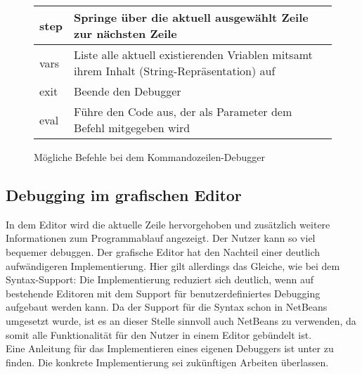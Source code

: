 \begin{figure}
	\centering
	\begin{tabular}{| m{4cm} | m{9cm} |}
	\hline
	step & Springe über die aktuell ausgewählt Zeile zur nächsten Zeile \\ \hline
	vars & Liste alle aktuell existierenden Vriablen mitsamt ihrem Inhalt (String-Repräsentation) auf \\ \hline
	exit & Beende den Debugger \\ \hline
	eval & Führe den Code aus, der als Parameter dem Befehl mitgegeben wird \\ \hline
	\end{tabular}
	\caption{Mögliche Befehle bei dem Kommandozeilen-Debugger}
	\label{fig:Commands_CLI_Debugger}
\end{figure}

\subsection{Debugging im grafischen Editor}
In dem Editor wird die aktuelle Zeile hervorgehoben und zusätzlich weitere Informationen zum Programmablauf angezeigt.
Der Nutzer kann so viel bequemer debuggen.
Der grafische Editor hat den Nachteil einer deutlich aufwändigeren Implementierung.
Hier gilt allerdings das Gleiche, wie bei dem Syntax-Support:
Die Implementierung reduziert sich deutlich, wenn auf bestehende Editoren mit dem Support für benutzerdefiniertes Debugging aufgebaut werden kann.
Da der Support für die Syntax schon in NetBeans umgesetzt wurde, ist es an dieser Stelle sinnvoll auch NetBeans zu verwenden, da somit alle Funktionalität für den Nutzer in einem Editor gebündelt ist.\\
Eine Anleitung für das Implementieren eines eigenen Debuggers ist unter \cite{netbeansDebugger} zu finden.
Die konkrete Implementierung sei zukünftigen Arbeiten überlassen.

\endinput
